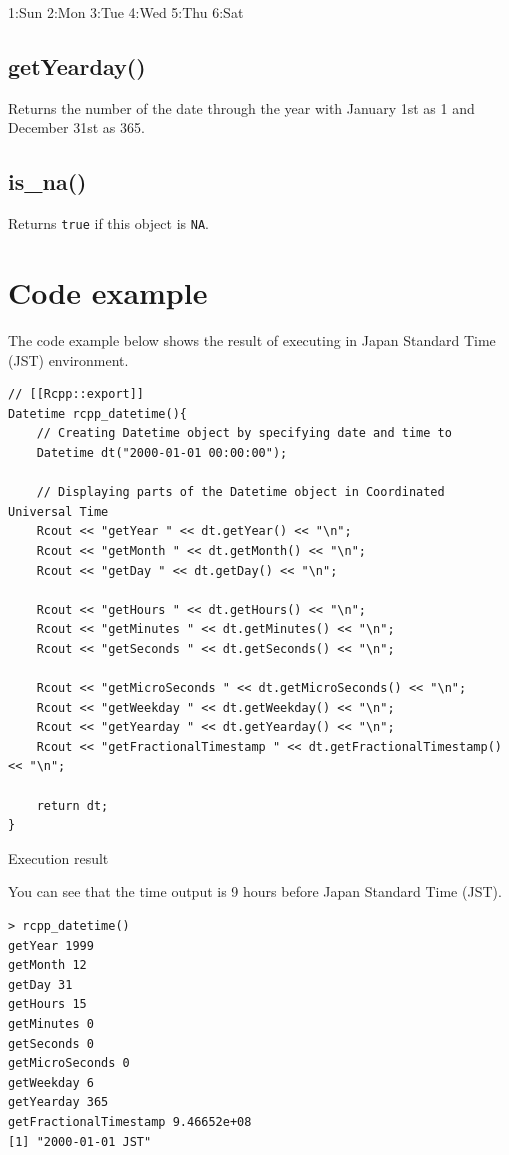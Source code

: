 \documentclass[]{book}
\begin{document}
1:Sun 2:Mon 3:Tue 4:Wed 5:Thu 6:Sat

\hypertarget{getyearday-1}{%
\subsection{getYearday()}\label{getyearday-1}}

Returns the number of the date through the year with January 1st as 1 and December 31st as 365.

\hypertarget{is_na-1}{%
\subsection{is\_na()}\label{is_na-1}}

Returns \texttt{true} if this object is \texttt{NA}.

\hypertarget{code-example-1}{%
\section{Code example}\label{code-example-1}}

The code example below shows the result of executing in Japan Standard Time (JST) environment.

\begin{verbatim}
// [[Rcpp::export]]
Datetime rcpp_datetime(){
    // Creating Datetime object by specifying date and time to
    Datetime dt("2000-01-01 00:00:00");

    // Displaying parts of the Datetime object in Coordinated Universal Time
    Rcout << "getYear " << dt.getYear() << "\n";
    Rcout << "getMonth " << dt.getMonth() << "\n";
    Rcout << "getDay " << dt.getDay() << "\n";

    Rcout << "getHours " << dt.getHours() << "\n";
    Rcout << "getMinutes " << dt.getMinutes() << "\n";
    Rcout << "getSeconds " << dt.getSeconds() << "\n";

    Rcout << "getMicroSeconds " << dt.getMicroSeconds() << "\n";
    Rcout << "getWeekday " << dt.getWeekday() << "\n";
    Rcout << "getYearday " << dt.getYearday() << "\n";
    Rcout << "getFractionalTimestamp " << dt.getFractionalTimestamp() << "\n";

    return dt;
}
\end{verbatim}

Execution result

You can see that the time output is 9 hours before Japan Standard Time (JST).

\begin{verbatim}
> rcpp_datetime()
getYear 1999
getMonth 12
getDay 31
getHours 15
getMinutes 0
getSeconds 0
getMicroSeconds 0
getWeekday 6
getYearday 365
getFractionalTimestamp 9.46652e+08
[1] "2000-01-01 JST"
\end{verbatim}
\end{document}
